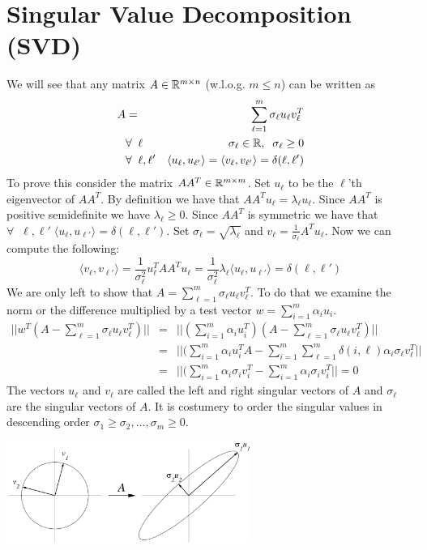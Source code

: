 \documentclass{article}
\begin{document}

\section{Singular Value Decomposition (SVD)}

We will see that any matrix $A \in {\mathbb{R}}^{m \times n}$ (w.l.o.g. $m \le n$) can be written as 
\begin{eqnarray}
A &=& \sum_{\ell=1}^{m} \sigma_{\ell} u_{\ell} v_{\ell}^{T}\\
&\forall \;\; \ell& \sigma_\ell \in {\mathbb{R}},  \;\; \sigma_\ell \ge 0\\
&\forall \;\; \ell, \ell'&  \langle u_{\ell}, u_{\ell'} \rangle=  \langle v_{\ell}, v_{\ell'} \rangle = \delta(\ell,\ell')
\end{eqnarray}
%
To prove this consider the matrix $AA^{T} \in {\mathbb{R}}^{m\times m}$.
Set $u_\ell$ to be the $\ell$'th eigenvector of $AA^{T}$.
By definition we have that $AA^{T}u_\ell = \lambda_\ell u_\ell$.
Since $AA^{T}$ is positive semidefinite we have $\lambda_\ell \ge 0$.
Since $AA^{T}$ is symmetric we have that $\forall \;\; \ell, \ell' \;  \langle u_{\ell}, u_{\ell'} \rangle = \delta(\ell,\ell')$.
Set $\sigma_\ell = \sqrt{\lambda_\ell}$ and $v_\ell = \frac{1}{\sigma_\ell}A^{T}u_{\ell}$.
Now we can compute the following:
\[
\langle v_{\ell}, v_{\ell'} \rangle =  \frac{1}{\sigma^{2}_\ell}u_{\ell}^{T}AA^{T}u_{\ell} =   \frac{1}{\sigma_{\ell}^{2}}\lambda_\ell  \langle u_{\ell}, u_{\ell'} \rangle = \delta(\ell,\ell')
\]
%
We are only left to show that $A = \sum_{\ell=1}^{m} \sigma_{\ell} u_{\ell} v_{\ell}^{T}$.
To do that we examine the norm or the difference multiplied by a test vector $w = \sum_{i=1}^{m} \alpha_i u_i$.
\begin{eqnarray*}
|| w^{T}(A - \sum_{\ell=1}^{m} \sigma_{\ell} u_{\ell} v_{\ell}^{T})|| &=& || (\sum_{i=1}^{m}\alpha_i u^{T}_{i})(A - \sum_{\ell=1}^{m} \sigma_{\ell} u_{\ell} v_{\ell}^{T})|| \\
&=& || (\sum_{i=1}^{m}\alpha_{i} u^{T}_{i}A - \sum_{i=1}^{m}\sum_{\ell=1}^{m} \delta(i,\ell) \alpha_i \sigma_{\ell} v_{\ell}^{T}|| \\
&=& || (\sum_{i=1}^{m}\alpha_{i} \sigma_{i} v^{T}_{i} - \sum_{i=1}^{m} \alpha_i \sigma_{i} v_{i}^{T}|| = 0
\end{eqnarray*}
%
The vectors $u_\ell$ and $v_{\ell}$ are called the left and right singular vectors of $A$ and $\sigma_\ell$ are the singular vectors of $A$.
It is costumery to order the singular values in descending order $\sigma_1 \ge \sigma_2, \ldots , \sigma_m \ge 0$.
\begin{center}
\includegraphics[width=0.6\textwidth]{06_images/SVDgeometry.eps}
\end{center}
\end{document}
